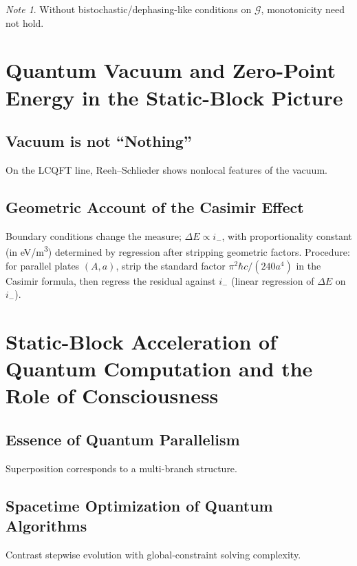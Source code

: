 \documentclass[11pt]{article}
\theoremstyle{definition}
\theoremstyle{remark}
\newtheorem*{note}{Note}
\begin{document}
\begin{note}
Without bistochastic/dephasing-like conditions on \( \mathcal{G} \), monotonicity need not hold.
\end{note}

\section{Quantum Vacuum and Zero-Point Energy in the Static-Block Picture}\label{sec:vacuum}

\subsection{Vacuum is not ``Nothing''}

On the LCQFT line, Reeh--Schlieder shows nonlocal features of the vacuum.

\subsection{Geometric Account of the Casimir Effect}

Boundary conditions change the measure; \( \Delta E \propto i_- \), with proportionality constant (in eV/m\textsuperscript{3}) determined by regression after stripping geometric factors. Procedure: for parallel plates \( (A,a) \), strip the standard factor \( \pi^2 \hbar c/(240 a^4) \) in the Casimir formula, then regress the residual against \( i_- \) (linear regression of \( \Delta E \) on \( i_- \)).

\section{Static-Block Acceleration of Quantum Computation and the Role of Consciousness}\label{sec:computation}

\subsection{Essence of Quantum Parallelism}

Superposition corresponds to a multi-branch structure.

\subsection{Spacetime Optimization of Quantum Algorithms}

Contrast stepwise evolution with global-constraint solving complexity.
\end{document}
